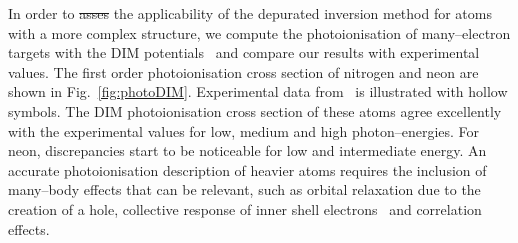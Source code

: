 \documentclass[10pt]{article}
\providecommand{\DIFaddtex}[1]{{\protect\color{blue}\uwave{#1}}} %
\providecommand{\DIFdeltex}[1]{{\protect\color{red}\sout{#1}}}                      %
\providecommand{\DIFaddbegin}{} %
\providecommand{\DIFaddend}{} %
\providecommand{\DIFdelbegin}{} %
\providecommand{\DIFdelend}{} %
\providecommand{\DIFadd}[1]{\texorpdfstring{\DIFaddtex{#1}}{#1}} %
\providecommand{\DIFdel}[1]{\texorpdfstring{\DIFdeltex{#1}}{}} %
\begin{document}
In order to \DIFdelbegin \DIFdel{asses }\DIFdelend \DIFaddbegin \DIFadd{assess }\DIFaddend the applicability of the depurated inversion method
for atoms with a more complex structure, we compute the 
photoionisation of many--electron targets with the DIM 
potentials~\cite{Mendez2016} and compare our results with 
experimental values. 
The first order photoionisation cross section of nitrogen and neon 
are shown in Fig.~\ref{fig:photoDIM}. Experimental data 
from~\cite{Henke1993,Samson1990,Samson2002,Stolte2016} is illustrated 
with hollow symbols. The DIM photoionisation cross section
of these atoms agree excellently with the experimental values for 
low, medium and high photon--energies. For neon, discrepancies start 
to be noticeable for low and intermediate energy. An accurate 
photoionisation description of heavier atoms requires the inclusion 
of many--body effects that can be relevant, such as orbital 
relaxation due to the creation of a hole, collective response 
of inner shell electrons~\cite{Ederer1964} and correlation effects.
\end{document}
